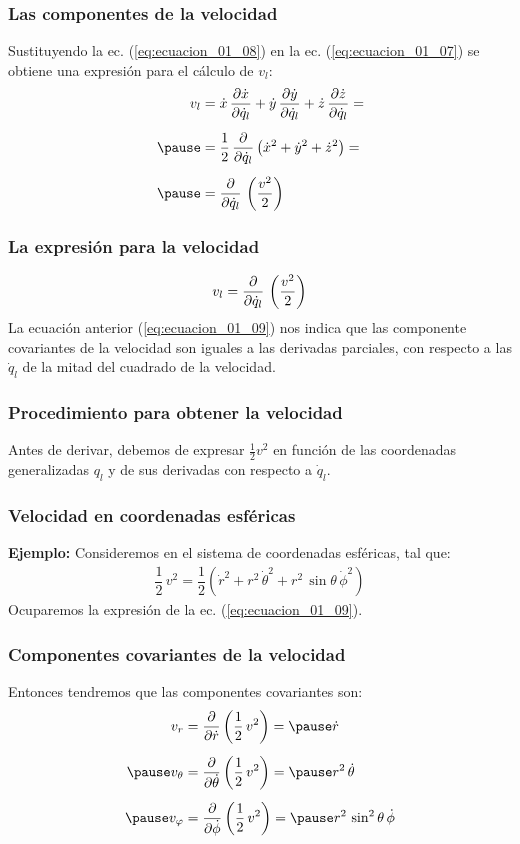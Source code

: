 \documentclass[12pt]{beamer}
\begin{document}
\begin{frame}
\frametitle{Las componentes de la velocidad}
Sustituyendo la ec. (\ref{eq:ecuacion_01_08}) en la ec. (\ref{eq:ecuacion_01_07}) se obtiene una expresión para el cálculo de $v_{l}$:
\pause
\begin{equation}
\begin{aligned}[b]
v_{l} &= \dot{x} \, \pdv{\dot{x}}{\dot{q}_{l}} + \dot{y} \, \pdv{\dot{y}}{\dot{q}_{l}} + \dot{z} \, \pdv{\dot{z}}{\dot{q}_{l}} = \\[0.5em] \pause
&= \dfrac{1}{2} \, \pdv{\dot{q}_{l}} \left( \dot{x}^{2} + \dot{y}^{2} + \dot{z}^{2} \right) = \\[0.5em] \pause
&= \pdv{\dot{q}_{l}} \, \left( \dfrac{v^{2}}{2} \right)
\end{aligned}
\label{eq:ecuacion_01_09}
\end{equation}
\end{frame}
\begin{frame}
\frametitle{La expresión para la velocidad}
\begin{align*}
v_{l} = \pdv{\dot{q}_{l}} \, \left( \dfrac{v^{2}}{2} \right)
\end{align*}
La ecuación anterior (\ref{eq:ecuacion_01_09}) nos indica que las componente covariantes de la velocidad son iguales a las derivadas parciales, con respecto a las $\dot{q}_{l}$ de la mitad del cuadrado de la velocidad.
\end{frame}
\begin{frame}
\frametitle{Procedimiento para obtener la velocidad}
Antes de derivar, debemos de expresar $\frac{1}{2} v^{2}$ en función de las coordenadas generalizadas $q_{l}$ y de sus derivadas con respecto a $\dot{q}_{l}$.
\end{frame}
\begin{frame}
\frametitle{Velocidad en coordenadas esféricas}
\textbf{Ejemplo: } Consideremos en el sistema de coordenadas esféricas, tal que:
\pause
\begin{align*}
\dfrac{1}{2} \, v^{2} = \dfrac{1}{2} \left( \dot{r}^{2} + r^{2} \, \dot{\theta}^{2} + r^{2} \, \sin \theta \, \dot{\phi}^{2} \right)
\end{align*}
\pause
Ocuparemos la expresión de la ec. (\ref{eq:ecuacion_01_09}).
\end{frame}
\begin{frame}
\frametitle{Componentes covariantes de la velocidad}
Entonces tendremos que las componentes covariantes son:
\begin{equation*}
\begin{aligned}
v_{r} &= \pdv{\dot{r}} \left( \dfrac{1}{2} \, v^{2} \right) = \pause \dot{r} \\[0.5em] \pause
v_{\theta} &= \pdv{\dot{\theta}} \left( \dfrac{1}{2} \, v^{2} \right) = \pause r^{2} \, \dot{\theta} \\[0.5em] \pause
v_{\varphi} &= \pdv{\dot{\phi}} \left( \dfrac{1}{2} \, v^{2} \right) = \pause r^{2} \, \sin^{2} \theta \, \dot{\phi}
\end{aligned}
\end{equation*}
\end{frame}
\end{document}
